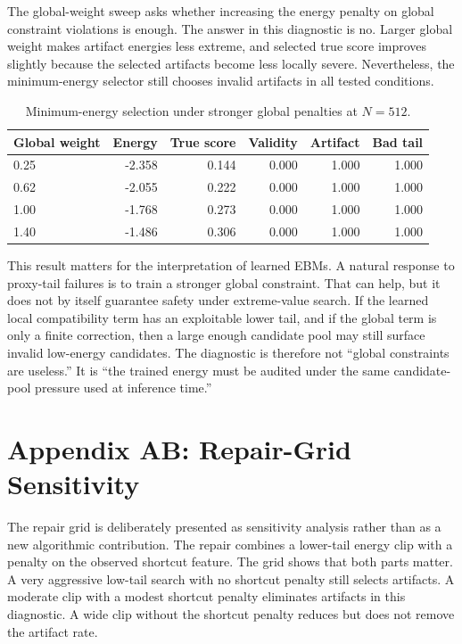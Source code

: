\documentclass{article}
\begin{document}
The global-weight sweep asks whether increasing the energy penalty on global
constraint violations is enough. The answer in this diagnostic is no. Larger
global weight makes artifact energies less extreme, and selected true score
improves slightly because the selected artifacts become less locally severe.
Nevertheless, the minimum-energy selector still chooses invalid artifacts in
all tested conditions.

\begin{table}[t]
\centering
\small
\begin{tabular}{lrrrrr}
\toprule
Global weight & Energy & True score & Validity & Artifact & Bad tail \\
\midrule
0.25 & -2.358 & 0.144 & 0.000 & 1.000 & 1.000 \\
0.62 & -2.055 & 0.222 & 0.000 & 1.000 & 1.000 \\
1.00 & -1.768 & 0.273 & 0.000 & 1.000 & 1.000 \\
1.40 & -1.486 & 0.306 & 0.000 & 1.000 & 1.000 \\
\bottomrule
\end{tabular}
\caption{Minimum-energy selection under stronger global penalties at $N=512$.}
\label{tab:global-stress}
\end{table}

This result matters for the interpretation of learned EBMs. A natural response
to proxy-tail failures is to train a stronger global constraint. That can help,
but it does not by itself guarantee safety under extreme-value search. If the
learned local compatibility term has an exploitable lower tail, and if the
global term is only a finite correction, then a large enough candidate pool may
still surface invalid low-energy candidates. The diagnostic is therefore not
``global constraints are useless.'' It is ``the trained energy must be audited
under the same candidate-pool pressure used at inference time.''

\section*{Appendix AB: Repair-Grid Sensitivity}

The repair grid is deliberately presented as sensitivity analysis rather than
as a new algorithmic contribution. The repair combines a lower-tail energy
clip with a penalty on the observed shortcut feature. The grid shows that both
parts matter. A very aggressive low-tail search with no shortcut penalty still
selects artifacts. A moderate clip with a modest shortcut penalty eliminates
artifacts in this diagnostic. A wide clip without the shortcut penalty reduces
but does not remove the artifact rate.
\end{document}
